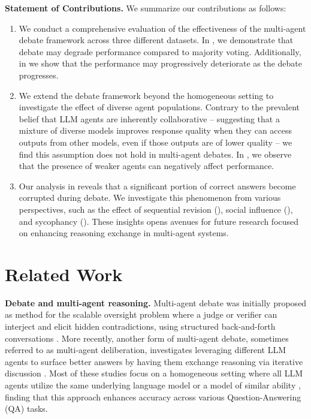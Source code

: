 \documentclass{article}
\begin{document}
\textbf{Statement of Contributions.} We summarize our contributions as follows:
\begin{enumerate}
    \item We conduct a comprehensive evaluation of the effectiveness of the multi-agent debate framework across three different datasets. In , we demonstrate that debate may degrade performance compared to majority voting. Additionally, in  we show that the performance may progressively deteriorate as the debate progresses.
    \item We extend the debate framework beyond the homogeneous setting to investigate the effect of diverse agent populations.  Contrary to the prevalent belief that LLM agents are inherently collaborative -- suggesting that a mixture of diverse models improves response quality when they can access outputs from other models, even if those outputs are of lower quality \citep{wang2024mixture} -- we find this assumption does not hold in multi-agent debates. In , we observe that the presence of weaker agents can negatively affect performance.
    \item Our analysis in  reveals that a significant portion of correct answers become corrupted during debate. We investigate this phenomenon from various perspectives, such as the effect of sequential revision (), social influence (), and sycophancy (). These insights opens avenues for future research focused on enhancing reasoning exchange in multi-agent systems.
\end{enumerate}
    

\section{Related Work}

\textbf{Debate and multi-agent reasoning.}
Multi-agent debate was initially proposed as method for the scalable oversight problem  where a judge or verifier can interject and elicit hidden contradictions, using structured back-and-forth conversations \citep{irving2018aisafetydebate, khan2024debatingpersuasivellmsleads, michael2023debatehelpssuperviseunreliable, kenton2024scalableoversightweakllms}. More recently, another form of multi-agent debate, sometimes referred to as multi-agent deliberation, investigates leveraging different LLM agents to surface better answers by having them exchange reasoning via iterative discussion \citep{chan2023chateval, liang2023encouraging, subramaniam2025multiagent}.  Most of these studies focus on a homogeneous setting where all LLM agents utilize the same underlying language model \citep{du2023improvingfactualityreasoninglanguage} or a model of similar ability \citep{yao2025peacemakertroublemakersycophancyshapes}, finding that this approach enhances accuracy across various Question-Answering (QA) tasks.
\end{document}
